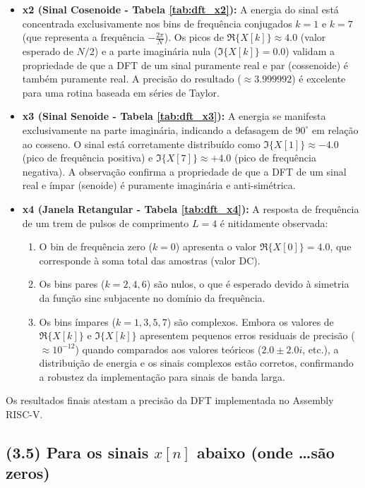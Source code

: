 \documentclass[12pt,a4paper]{article}
\begin{document}
\begin{itemize}
    \item \textbf{x2 (Sinal Cosenoide - Tabela \ref{tab:dft_x2}):}
    A energia do sinal está concentrada exclusivamente nos bins de frequência conjugados $k=1$ e $k=7$ (que representa a frequência $-\frac{2\pi}{N}$).
    Os picos de $\Re\{X[k]\} \approx 4.0$ (valor esperado de $N/2$) e a parte imaginária nula ($\Im\{X[k]\} = 0.0$) validam a propriedade de que a DFT de um sinal puramente real e par (cossenoide) é também puramente real. A precisão do resultado ($\approx 3.999992$) é excelente para uma rotina baseada em séries de Taylor.

    \item \textbf{x3 (Sinal Senoide - Tabela \ref{tab:dft_x3}):}
    A energia se manifesta exclusivamente na parte imaginária, indicando a defasagem de $90^{\circ}$ em relação ao cosseno.
    O sinal está corretamente distribuído como $\Im\{X[1]\} \approx -4.0$ (pico de frequência positiva) e $\Im\{X[7]\} \approx +4.0$ (pico de frequência negativa). A observação confirma a propriedade de que a DFT de um sinal real e ímpar (senoide) é puramente imaginária e anti-simétrica.

\item \textbf{x4 (Janela Retangular - Tabela \ref{tab:dft_x4}):}
    A resposta de frequência de um trem de pulsos de comprimento $L=4$ é nitidamente observada:
    \begin{enumerate}
        \item O bin de frequência zero ($k=0$) apresenta o valor $\Re\{X[0]\} = 4.0$, que corresponde à soma total das amostras (valor DC).
        \item Os bins pares ($k=2, 4, 6$) são nulos, o que é esperado devido à simetria da função sinc subjacente no domínio da frequência.
        \item Os bins ímpares ($k=1, 3, 5, 7$) são complexos. Embora os valores de $\Re\{X[k]\}$ e $\Im\{X[k]\}$ apresentem pequenos erros residuais de precisão ($\approx 10^{-12}$) quando comparados aos valores teóricos ($2.0 \pm 2.0i$, etc.), a distribuição de energia e os sinais complexos estão corretos, confirmando a robustez da implementação para sinais de banda larga.
    \end{enumerate}
\end{itemize}

Os resultados finais atestam a precisão da DFT implementada no Assembly RISC-V.

\subsection*{(3.5) Para os sinais $x[n]$ abaixo (onde \dots são zeros)}
\end{document}
